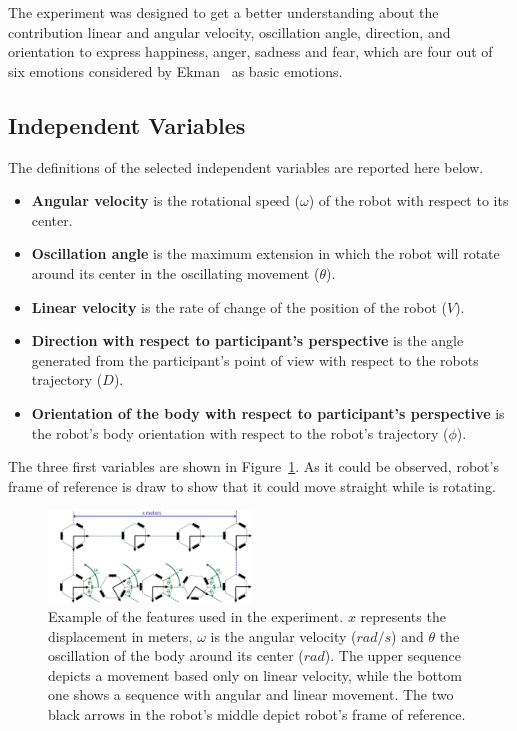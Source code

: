 
The experiment was designed to get a better understanding about the contribution linear and angular velocity, oscillation angle, direction, and orientation to express happiness, anger, sadness and fear, which are four out of six emotions considered by Ekman~\cite{Ekman2004} as basic emotions.

\subsection{Independent Variables}

The definitions of the selected independent variables are reported here below.

\begin{itemize}
	\item \textbf{Angular velocity} is the rotational speed  ($\omega$) of the robot with respect to its center.

	\item \textbf{Oscillation angle} is the maximum extension in which the robot will rotate around its center in the oscillating movement ($\theta$).

	\item \textbf{Linear velocity} is the rate of change of the position of the robot ($V$). 

	\item \textbf{Direction with respect to participant's perspective} is the angle generated from the participant's point of view with respect to the robots trajectory ($D$).

	\item \textbf{Orientation of the body with respect to participant's perspective} is the robot's body orientation with respect to the robot's trajectory ($\phi$).

\end{itemize}

The three first variables are shown in Figure~\ref{fig:angular_movement}. As it could be observed, robot's frame of reference is draw to show that it could move straight while is rotating.


\begin{figure}
	\centering
	\includegraphics[width=0.48\textwidth]{./Images/ExampleMovement.png} 
	\caption{Example of the features used in the experiment. $x$ represents the displacement in meters, $\omega$ is the angular velocity ($rad/s$) and $\theta$ the oscillation of the body around its center ($rad$). The upper sequence depicts a movement based only on linear velocity, while the bottom one shows a sequence with angular and linear movement. The two black arrows in the robot's middle depict robot's frame of reference.}
	\label{fig:angular_movement}
	
\end{figure} 

